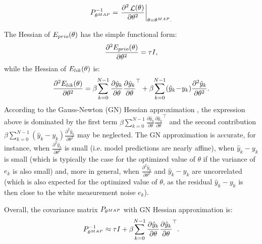 \documentclass{ifacconf}
\DeclareMathOperator{\nll}{\mathcal{L}}
\newcommand{\nsamp}{N}
\newcommand{\MAP}{{\rm MAP}}
\newcommand{\mean}[1]{\hat{#1}}
\begin{document}
\begin{equation}
 P_{\theta^\MAP}^{-1} =  \left .\frac{\partial^2 \nll(\theta)}{\partial \theta^2} \right |_{\theta = {\theta^\MAP} .}
\end{equation}

The Hessian of $E_{\rm prio}(\theta)$ has the simple functional form:
\begin{equation}
 \frac{\partial^2 E_{\rm prio}(\theta)}{\partial \theta^2} 
 = \tau I,
\end{equation}
while the Hessian of $E_{\rm lik}(\theta)$ is:
\begin{equation}
\label{eq:full_hessian}
\frac{\partial^2 E_{\rm lik}(\theta)}{\partial \theta^2}
=  \beta \!\sum_{k=0}^{\nsamp-1} \frac{\partial \mean{y}_k}{\partial \theta} {\frac{\partial \mean{y}_k}{\partial \theta}}^{\top} +%
\beta \!\sum_{k=0}^{\nsamp-1} (\mean{y}_k\! -\! y_k) \frac{\partial^2 \mean{y}_k}{\partial \theta^2}.
\end{equation}
According to the  Gauss-Newton (GN) Hessian approximation \cite{wright1999numerical}, the expression above  is dominated by the first term $\beta \!\sum_{k=0}^{\nsamp-1} \frac{\partial \mean{y}_k}{\partial \theta} {\frac{\partial \mean{y}_k}{\partial \theta}}^{\top}$ and the second contribution $\beta \sum_{k=0}^{\nsamp-1} (\mean{y}_k - y_k) \frac{\partial^2 \mean{y}_k}{\partial \theta^2}$ may be neglected.  The GN approximation is accurate, for instance, when $\frac{\partial^2 \mean{y}_k}{\partial \theta^2}$ is small (i.e. model predictions are nearly affine), when $\mean{y}_k - y_k$ is small (which is typically the case for the optimized value of $\theta$ if the variance of $e_k$ 
is also small) and, more in general, when $\frac{\partial^2 \mean{y}_k}{\partial \theta^2}$ and $\mean{y}_k - y_k$ are uncorrelated (which is also expected
for the optimized value of $\theta$, as the residual $\mean{y}_k - y_k$ is then close to the white measurement noise $e_k$).


Overall, the covariance matrix $P_{\theta^{\MAP}}$ with GN Hessian approximation is:
\begin{equation}
\label{eq:P_post}
P_{\theta^{\rm MAP}}^{-1} \approx \tau I + \beta \!\sum_{k=0}^{\nsamp-1} \frac{\partial \mean{y}_k}{\partial \theta} {\frac{\partial \mean{y}_k}{\partial \theta}}^\top.
\end{equation}
\end{document}
